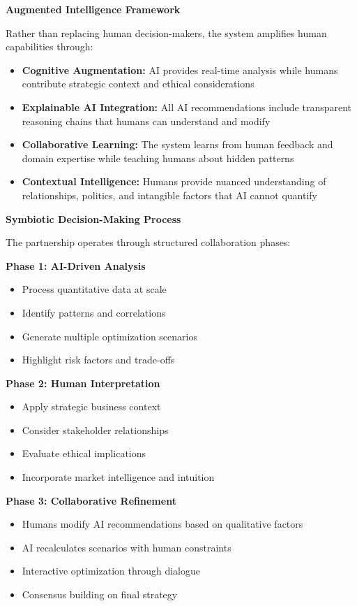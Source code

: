 \documentclass{article}
\begin{document}
\textbf{Augmented Intelligence Framework}

Rather than replacing human decision-makers, the system amplifies human capabilities through:

\begin{itemize}
\item \textbf{Cognitive Augmentation:} AI provides real-time analysis while humans contribute strategic context and ethical considerations
\item \textbf{Explainable AI Integration:} All AI recommendations include transparent reasoning chains that humans can understand and modify
\item \textbf{Collaborative Learning:} The system learns from human feedback and domain expertise while teaching humans about hidden patterns
\item \textbf{Contextual Intelligence:} Humans provide nuanced understanding of relationships, politics, and intangible factors that AI cannot quantify
\end{itemize}

\textbf{Symbiotic Decision-Making Process}

The partnership operates through structured collaboration phases:

\textbf{Phase 1: AI-Driven Analysis}
\begin{itemize}
\item Process quantitative data at scale
\item Identify patterns and correlations
\item Generate multiple optimization scenarios
\item Highlight risk factors and trade-offs
\end{itemize}

\textbf{Phase 2: Human Interpretation}
\begin{itemize}
\item Apply strategic business context
\item Consider stakeholder relationships
\item Evaluate ethical implications
\item Incorporate market intelligence and intuition
\end{itemize}

\textbf{Phase 3: Collaborative Refinement}
\begin{itemize}
\item Humans modify AI recommendations based on qualitative factors
\item AI recalculates scenarios with human constraints
\item Interactive optimization through dialogue
\item Consensus building on final strategy
\end{itemize}
\end{document}
